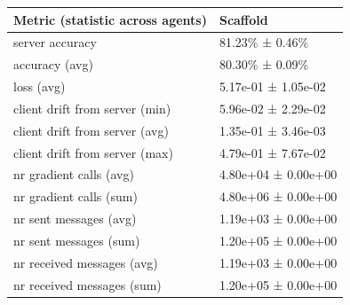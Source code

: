 \begin{tabular}{ll}
\hline
 Metric (statistic across agents)   & Scaffold            \\
\hline
 server accuracy                    & 81.23\% ± 0.46\%      \\
 accuracy (avg)                     & 80.30\% ± 0.09\%      \\
 loss (avg)                         & 5.17e-01 ± 1.05e-02 \\
 client drift from server (min)     & 5.96e-02 ± 2.29e-02 \\
 client drift from server (avg)     & 1.35e-01 ± 3.46e-03 \\
 client drift from server (max)     & 4.79e-01 ± 7.67e-02 \\
 nr gradient calls (avg)            & 4.80e+04 ± 0.00e+00 \\
 nr gradient calls (sum)            & 4.80e+06 ± 0.00e+00 \\
 nr sent messages (avg)             & 1.19e+03 ± 0.00e+00 \\
 nr sent messages (sum)             & 1.20e+05 ± 0.00e+00 \\
 nr received messages (avg)         & 1.19e+03 ± 0.00e+00 \\
 nr received messages (sum)         & 1.20e+05 ± 0.00e+00 \\
\hline
\end{tabular}